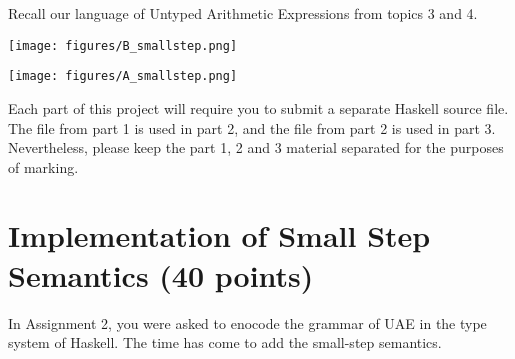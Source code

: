 \documentclass{exam}
\begin{document}
\begin{center}
\end{center}

Recall our language of Untyped Arithmetic Expressions from topics 3 and 4. 
\begin{center}

\texttt{[image: figures/B\_smallstep.png]}

\texttt{[image: figures/A\_smallstep.png]}

\end{center}

Each part of this project will require you to submit a separate Haskell source file.  The file from part 1 is used in part 2, and the file from part 2 is used in part 3.  Nevertheless, please keep the part 1, 2 and 3 material separated for the purposes of marking.  

\section{Implementation of Small Step Semantics (40 points)}

In Assignment 2, you were asked to enocode the grammar of UAE in the type system of Haskell.  The time has come to add the small-step semantics.
\end{document}
